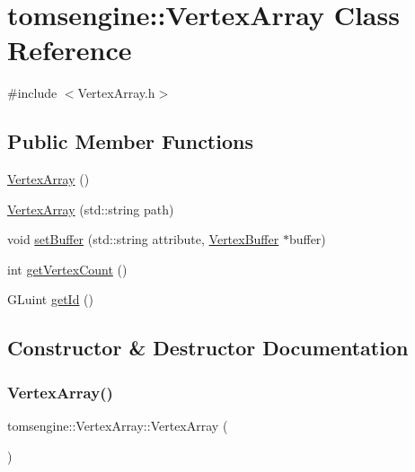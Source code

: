 \hypertarget{classtomsengine_1_1_vertex_array}{}\section{tomsengine\+:\+:Vertex\+Array Class Reference}
\label{classtomsengine_1_1_vertex_array}


{\ttfamily \#include $<$Vertex\+Array.\+h$>$}

\subsection*{Public Member Functions}
\begin{DoxyCompactItemize}
\item 
\mbox{\hyperlink{classtomsengine_1_1_vertex_array_a3303a68dab144005078e112096690361}{Vertex\+Array}} ()
\item 
\mbox{\hyperlink{classtomsengine_1_1_vertex_array_ab8e0cf34f040957b0293594218c15fea}{Vertex\+Array}} (std\+::string path)
\item 
void \mbox{\hyperlink{classtomsengine_1_1_vertex_array_a874821cb99cd06bd58eb9a3e552c54aa}{set\+Buffer}} (std\+::string attribute, \mbox{\hyperlink{classtomsengine_1_1_vertex_buffer}{Vertex\+Buffer}} $\ast$buffer)
\item 
int \mbox{\hyperlink{classtomsengine_1_1_vertex_array_a9084bfe0cfa2dc86a2322079b5ed13d4}{get\+Vertex\+Count}} ()
\item 
G\+Luint \mbox{\hyperlink{classtomsengine_1_1_vertex_array_a6b5d7767d60c35451a34237cf36f0166}{get\+Id}} ()
\end{DoxyCompactItemize}


\subsection{Constructor \& Destructor Documentation}
\mbox{\label{classtomsengine_1_1_vertex_array_a3303a68dab144005078e112096690361}} 
\subsubsection{\texorpdfstring{Vertex\+Array()}{VertexArray()}\hspace{0.1cm}{\footnotesize\ttfamily [1/2]}}
{\footnotesize\ttfamily tomsengine\+::\+Vertex\+Array\+::\+Vertex\+Array (\begin{DoxyParamCaption}{ }\end{DoxyParamCaption})}

